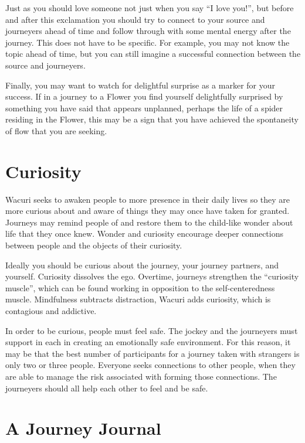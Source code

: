 \documentclass[12pt]{book}
\begin{document}
					
Just as you should love someone not just when you say “I love you!”, but before and after this exclamation you should try to connect to your source and journeyers ahead of time and follow through with some mental energy after the journey. This does not have to be specific. For example, you may not know the topic ahead of time, but you can still imagine a successful connection between the source and journeyers.
					
Finally, you may want to watch for delightful surprise as a marker for your success. If in a journey to a Flower you find yourself delightfully surprised by something you have said that appears unplanned, perhaps the life of a spider residing in the Flower, this may be a sign that you have achieved the spontaneity of flow that you are seeking.
				
			
\chapter{Curiosity}

Wacuri seeks to awaken people to more presence in their daily lives so they are more curious about and aware of things they may once have taken for granted. Journeys may remind people of and restore them to the child-like wonder about life that they once knew. Wonder and curiosity encourage deeper connections between people and the objects of their curiosity.
					
Ideally you should be curious about the journey, your journey partners, and yourself. Curiosity dissolves the ego. Overtime, journeys strengthen the “curiosity muscle”, which can be found working in opposition to the self-centeredness muscle. Mindfulness subtracts distraction, Wacuri adds curiosity, which is contagious and addictive.
					
In order to be curious, people must feel safe. The jockey and the journeyers must support in each in creating an emotionally safe environment. For this reason, it may be that the best number of participants for a journey taken with strangers is only two or three people. Everyone seeks connections to other people, when they are able to manage the risk associated with forming those connections. The journeyers should all help each other to feel and be safe.


\chapter{A Journey Journal}
\end{document}

